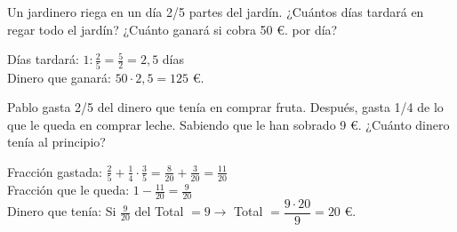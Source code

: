 \documentclass[addpoints,spanish, 12pt,a4paper]{exam}
\begin{document}
\begin{questions}
\addpoints

\question[2] Un jardinero riega en un día 2/5 partes del jardín. ¿Cuántos días tardará en regar todo el jardín? ¿Cuánto ganará si cobra 50 \euro. por día?
\begin{solution} Días tardará: $1:\frac{2}{5}=\frac{5}{2}=2,5$ días  \\
Dinero que ganará: $50\cdot2,5=125$ \euro. \end{solution}


\question[2] Pablo gasta 2/5 del dinero que tenía en comprar fruta. Después, gasta 1/4 de lo que le queda en comprar leche. Sabiendo que le han sobrado 9 \euro. ¿Cuánto dinero tenía al principio?
\begin{solution} Fracción gastada: $\frac{2}{5}+\frac{1}{4}\cdot\frac{3}{5}=\frac{8}{20}+\frac{3}{20}=\frac{11}{20}$  \\
Fracción que le queda: $1-\frac{11}{20}=\frac{9}{20}$ \\
Dinero que tenía: Si $\frac{9}{20}$ del Total $= 9\to$ Total $=\dfrac{9\cdot20}{9}=20$ \euro. \end{solution}

\addpoints


\end{questions}
\end{document}
